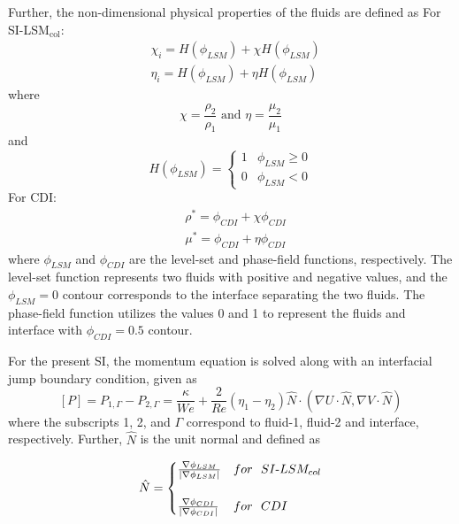 \documentclass[a4paper,fleqn]{cas-sc}
\begin{document}
	Further, the non-dimensional physical properties of the fluids are defined as
	\newline
	\noindent For SI-LSM$_{\text{col}}$:  
	\begin{equation*}
		\begin{aligned}
			&\chi_{i}=H(\phi_{LSM}) + \chi H(\phi_{LSM})\\
			&\eta_{i}=H(\phi_{LSM}) + \eta H(\phi_{LSM})
		\end{aligned}
	\end{equation*}
	where
	\begin{equation*}
		\chi=\frac{\rho_2}{\rho_1}\text{ and }\eta=\frac{\mu_2}{\mu_1}
	\end{equation*}
	and
	\begin{equation}\label{eqt:heaviside_SI}
		H(\phi_{LSM})=\begin{cases}
			1&\phi_{LSM}\ge0\\
			0&\phi_{LSM}< 0
		\end{cases}
	\end{equation}
	\newline
	\noindent For CDI:
	\begin{equation*}
		\begin{aligned}
			&\rho^{*}=\phi_{CDI} + \chi \phi_{CDI}\\
			&\mu^{*}=\phi_{CDI} + \eta \phi_{CDI}
		\end{aligned}
	\end{equation*}
	where $\phi_{LSM}$ and $\phi_{CDI}$ are the level-set and phase-field functions, respectively. The level-set function represents two fluids with positive and negative values, and the $\phi_{LSM}=0$ contour corresponds to the interface separating the two fluids. The phase-field function utilizes the values 0 and 1 to represent the fluids and interface with $\phi_{CDI}=0.5$ contour.
	
	For the present SI, the momentum equation is solved along with an interfacial jump boundary condition, given as 
	\begin{equation}\label{eqt:Pressure_JumpBC}
		[P]= P_{1,\Gamma}-P_{2,\Gamma}=\frac{\kappa}{We}+\frac{2}{Re}(\eta_{1}-\eta_{2})\hat{N}\cdot(\nabla U\cdot\hat{N},\nabla V\cdot\hat{N})
	\end{equation}
	where the subscripts 1, 2, and $\Gamma$ correspond to fluid-1, fluid-2 and interface, respectively. Further, $\hat{N}$ is the unit normal and defined as 
	
	\begin{equation}\label{eqt:heaviside_SI}
		\hat{N}=\begin{cases}
			\frac{\nabla\phi_{LSM}}{|\nabla\phi_{LSM}|} & for~~SI$-$LSM_{col}\\ \\
			\frac{\nabla\phi_{CDI}}{|\nabla\phi_{CDI}|} & for~~CDI
		\end{cases}
	\end{equation}
	
\end{document}
